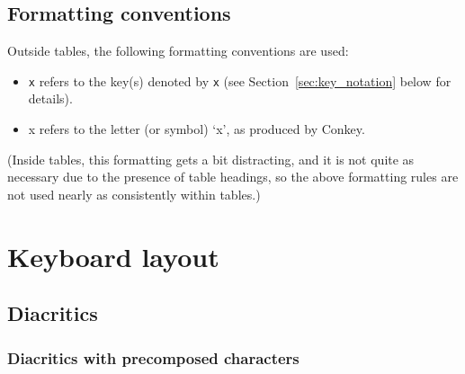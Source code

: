 \documentclass[oneside]{memoir}
\newcommand{\key}{\verb}
\newcommand{\out}[1]{\colorbox{gray!20}{#1}}
\begin{document}
\section{Formatting conventions}
\label{sec:formatting}

Outside tables, the following formatting conventions are used:

\begin{itemize}[noitemsep]
\item \key|x| refers to the key(s) denoted by \key|x| (see Section~\ref{sec:key_notation} below for details).
\item \out{x} refers to the letter (or symbol) `x', as produced by Conkey.
\end{itemize}

(Inside tables, this formatting gets a bit distracting, and it is not quite as necessary due to the presence of table headings,
  so the above formatting rules are not used nearly as consistently within tables.)

\chapter{Keyboard layout}
\label{sec:keyboard_layout}

\section{Diacritics}
\label{sec:diacritics}

\subsection{Diacritics with precomposed characters}
\label{sec:diacritics_with_precomposed_characters}
\end{document}
